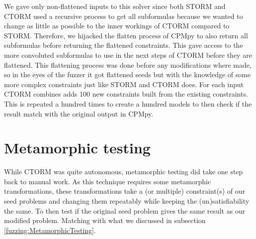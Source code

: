 We gave only non-flattened inputs to this solver since both STORM and CTORM used a recursive process to get all subformulas because we wanted to change as little as possible to the inner workings of CTORM compared to STORM. Therefore, we hijacked the flatten process of CPMpy to also return all subformulas before returning the flattened constraints. This gave access to the more convoluted subformulas to use in the next steps of CTORM before they are flattened. This flattening process was done before any modifications where made, so in the eyes of the fuzzer it got flattened seeds but with the knowledge of some more complex constraints just like STORM and CTORM does. For each input CTORM combines adds 100 new constraints built from the existing constraints. This is repeated a hundred times to create a hundred models to then check if the result match with the original output in CPMpy.

%


\section{Metamorphic testing}
\label{impl:Meta}
While CTORM was quite autonomous, metamorphic testing did take one step back to manual work. As this technique requires some metamorphic transformations, these transformations take a (or multiple) constraint(s) of our seed problems and changing them repeatably while keeping the (un)satisfiability the same. To then test if the original seed problem gives the same result as our modified problem. Matching with what we discussed in subsection \ref{fuzzing:MetamorphicTesting}. 

